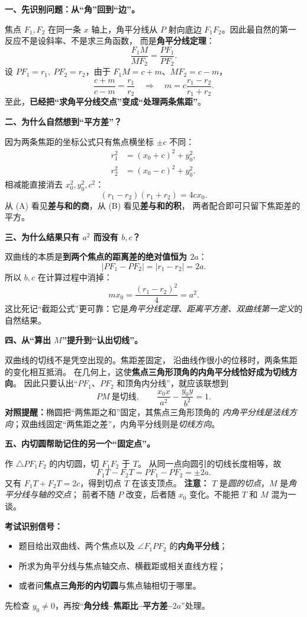 \begin{explanationbox}
\textbf{一、先识别问题：从“角”回到“边”。}

焦点 $F_1,F_2$ 在同一条 $x$ 轴上，角平分线从 $P$ 射向底边
$F_1F_2$。因此最自然的第一反应不是设斜率、不是求三角函数，
而是\textbf{角平分线定理}：
\[
\frac{F_1M}{MF_2}=\frac{PF_1}{PF_2}.
\]
设 $PF_1=r_1,\ PF_2=r_2$，由于 $F_1M=c+m$、$MF_2=c-m$，
\[
\frac{c+m}{c-m}=\frac{r_1}{r_2}
\quad\Longrightarrow\quad
\boxed{m=c\frac{r_1-r_2}{r_1+r_2}}.\tag{A}
\]
至此，\textbf{已经把“求角平分线交点”变成“处理两条焦距”}。

\medskip
\textbf{二、为什么自然想到“平方差”？}

因为两条焦距的坐标公式只有焦点横坐标 $\pm c$ 不同：
\[
\begin{aligned}
r_1^2&=(x_0+c)^2+y_0^2,\\
r_2^2&=(x_0-c)^2+y_0^2.
\end{aligned}
\]
相减能直接消去 $x_0^2,y_0^2,c^2$：
\[
\boxed{(r_1-r_2)(r_1+r_2)=4cx_0}.\tag{B}
\]
从 (A) 看见\textbf{差与和的商}，从 (B) 看见\textbf{差与和的积}，
两者配合即可只留下焦距差的平方。

\medskip
\textbf{三、为什么结果只有 $a^2$ 而没有 $b,c$？}

双曲线的本质是\textbf{到两个焦点的距离差的绝对值恒为 $2a$}：
\[
|PF_1-PF_2|=|r_1-r_2|=2a.
\]
所以 $b,c$ 在计算过程中消掉：
\[
mx_0=\frac{(r_1-r_2)^2}{4}=a^2.
\]
这比死记“截距公式”更可靠：它是\emph{角平分线定理、距离平方差、双曲线第一定义}的自然结果。

\medskip
\textbf{四、从“算出 $M$”提升到“认出切线”。}

双曲线的切线不是凭空出现的。焦距差固定，
沿曲线作很小的位移时，两条焦距的变化相互抵消。
在几何上，这使\textbf{焦点三角形顶角的内角平分线恰好成为切线方向}。
因此只要认出“$PF_1$、$PF_2$ 和顶角内分线”，就应该联想到
\[
PM\ \text{是切线},\qquad \frac{x_0x}{a^2}-\frac{y_0y}{b^2}=1.
\]
\textbf{对照提醒：}椭圆把“两焦距之和”固定，其焦点三角形顶角的
\emph{内角平分线是法线方向}；双曲线固定“两焦距之差”，内角平分线则是\emph{切线方向}。

\medskip
\textbf{五、内切圆帮助记住的另一个“固定点”。}

作 $\triangle PF_1F_2$ 的内切圆，切 $F_1F_2$ 于 $T$。
从同一点向圆引的切线长度相等，故
\[
F_1T-F_2T=PF_1-PF_2=\pm2a.
\]
又有 $F_1T+F_2T=2c$，得到切点 $T$ 在该支顶点。
\textbf{注意：} $T$ 是\emph{圆的切点}，$M$ 是\emph{角平分线与轴的交点}；
前者不随 $P$ 改变，后者随 $x_0$ 变化。不能把 $T$ 和 $M$ 混为一谈。

\medskip
\textbf{考试识别信号：}
\begin{itemize}
  \item 题目给出双曲线、两个焦点以及 $\angle F_1PF_2$ 的\textbf{内角平分线}；
  \item 所求为角平分线与焦点轴交点、横截距或相关直线方程；
  \item 或者问\textbf{焦点三角形的内切圆}与焦点轴相切于哪里。
\end{itemize}
先检查 $y_0\ne0$，再按“\textbf{角分线--焦距比--平方差--$2a$}”处理。
\end{explanationbox}
